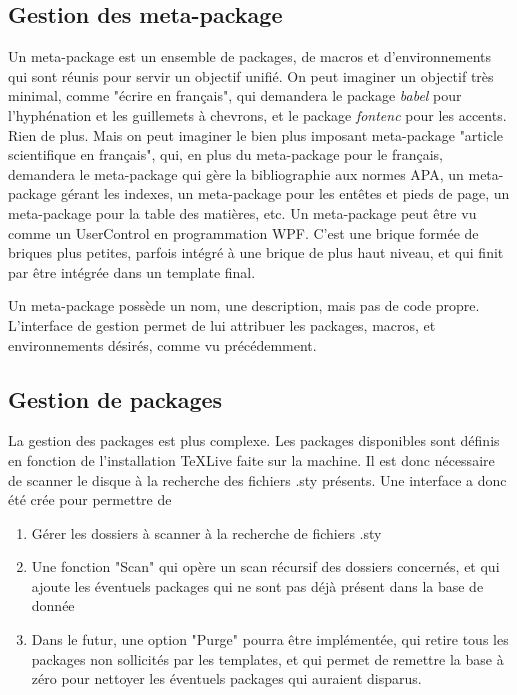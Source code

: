 \documentclass[a4paper, oneside]{article}
\begin{document}
\subsection{Gestion des meta-package}
\label{sec:org59cdef6}
Un meta-package est un ensemble de packages, de macros et
d'environnements qui sont réunis pour servir un objectif unifié. On
peut imaginer un objectif très minimal, comme "écrire en français",
qui demandera le package \emph{babel} pour l'hyphénation et les guillemets
à chevrons, et le package \emph{fontenc} pour les accents. Rien de
plus. Mais on peut imaginer le bien plus imposant meta-package
"article scientifique en français", qui, en plus du meta-package pour
le français, demandera le meta-package qui gère la bibliographie aux
normes APA, un meta-package gérant les indexes, un meta-package pour
les entêtes et pieds de page, un meta-package pour la table des
matières, etc. Un meta-package peut être vu comme un UserControl en
programmation WPF. C'est une brique formée de briques plus petites,
parfois intégré à une brique de plus haut niveau, et qui finit par
être intégrée dans un template final.

Un meta-package possède un nom, une description, mais pas de code
propre. L'interface de gestion permet de lui attribuer les packages,
macros, et environnements désirés, comme vu précédemment.

\subsection{Gestion de packages}
\label{sec:org9b6d427}
La gestion des packages est plus complexe. Les packages disponibles
sont définis en fonction de l'installation TeXLive faite sur la
machine. Il est donc nécessaire de scanner le disque à la recherche
des fichiers .sty présents. Une interface a donc été crée pour
permettre de
\begin{enumerate}
\item Gérer les dossiers à scanner à la recherche de fichiers .sty
\item Une fonction "Scan" qui opère un scan récursif des dossiers
concernés, et qui ajoute les éventuels packages qui ne sont pas
déjà présent dans la base de donnée
\item Dans le futur, une option "Purge" pourra être implémentée, qui
retire tous les packages non sollicités par les templates, et qui
permet de remettre la base à zéro pour nettoyer les éventuels
packages qui auraient disparus.
\end{enumerate}
\end{document}
